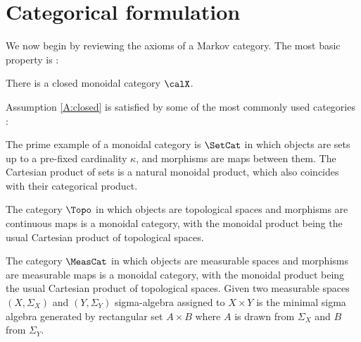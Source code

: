 \documentclass[12pt,oneside,pb-diagram]{article}
\begin{document}

\section{Categorical formulation} \label{sec:formal}

We now begin by reviewing the axioms of a Markov category. The most basic property is :

\begin{Assumption} \label{A:closed}
	There is a closed monoidal category $\calX$.
\end{Assumption}

Assumption \ref{A:closed} is satisfied by some of the most commonly used categories :

\begin{Erg}{}{} 
	The prime example of a monoidal category is $\SetCat$ in which objects are sets up to a pre-fixed cardinality $\kappa$, and morphisms are maps between them. The Cartesian product of sets is a natural monoidal product, which also coincides with their categorical product.
\end{Erg}

\begin{Erg}{}{} 
	The category $\Topo$ in which objects are topological spaces and morphisms are continuous maps is a monoidal category, with the monoidal product being the usual Cartesian product of topological spaces.
\end{Erg}

\begin{Erg}{}{} 
	The category $\MeasCat$ in which objects are measurable spaces and morphisms are measurable maps is a monoidal category, with the monoidal product being the usual Cartesian product of topological spaces. Given two measurable spaces $(X, \Sigma_X)$ and $(Y, \Sigma_Y)$ sigma-algebra assigned to $X\times Y$ is the minimal sigma algebra generated by rectangular set $A\times B$ where $A$ is drawn from $\Sigma_X$ and $B$ from $\Sigma_Y$.
\end{Erg}
\end{document}
